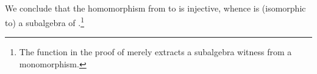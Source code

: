 \begin{itemize}
\begin{code}
\AgdaSpace{}%
\AgdaSpace{}%
\AgdaOperator{\AgdaFunction{𝔻[}}\AgdaSpace{}%
\AgdaSpace{}%
\AgdaSpace{}%
\AgdaOperator{\AgdaFunction{]}}\AgdaSpace{}%
\AgdaSpace{}%
\AgdaSymbol{(}\AgdaSpace{}%
\AgdaSpace{}%
\AgdaSymbol{;}\AgdaSpace{}%
\AgdaSpace{}%
\AgdaSymbol{;}\AgdaSpace{}%
\AgdaSpace{}%
\AgdaSymbol{)}\<%
\\
%
\>[3]\AgdaSpace{}%
\AgdaSymbol{:}\AgdaSpace{}%
\AgdaSpace{}%
\AgdaSpace{}%
\AgdaSpace{}%
\AgdaSpace{}%
\AgdaSpace{}%
\AgdaSpace{}%
\AgdaSpace{}%
\AgdaSpace{}%
\AgdaSpace{}%
\AgdaSpace{}%
\AgdaSpace{}%
\AgdaSpace{}%
\AgdaSpace{}%
\AgdaSpace{}%
\AgdaSpace{}%
\AgdaSpace{}%
\<%
\\
%
\>[3]%
\>[9]\AgdaSymbol{=}\AgdaSpace{}%
\AgdaSpace{}%
\AgdaSymbol{(}\AgdaSymbol{\{}\AgdaSpace{}%
\AgdaSymbol{=}\AgdaSpace{}%
\AgdaSpace{}%
\AgdaSpace{}%
\AgdaSymbol{\}(}\AgdaSpace{}%
\AgdaSpace{}%
\AgdaSpace{}%
\AgdaSymbol{)}\AgdaSpace{}%
\AgdaSymbol{)}\<%
\\
%
\>[9]\AgdaSymbol{(}\AgdaSpace{}%
\AgdaSpace{}%
\AgdaSymbol{(}\AgdaSpace{}%
\AgdaSymbol{)(}\AgdaSpace{}%
\AgdaSymbol{(}\AgdaSymbol{\{}\AgdaSpace{}%
\AgdaSymbol{=}\AgdaSpace{}%
\AgdaSpace{}%
\AgdaSpace{}%
\AgdaSymbol{\}}\AgdaSpace{}%
\AgdaSymbol{(}\AgdaSpace{}%
\AgdaSpace{}%
\AgdaSpace{}%
\AgdaSymbol{)}\AgdaSpace{}%
\AgdaSymbol{)))}\<%
\\
\>[0]\<%
\end{code}
\fi
\noindent We conclude that the homomorphism from  to  is injective, whence
 is (isomorphic to) a subalgebra of .\footnote{The function  in
the proof of  merely extracts a subalgebra witness from a monomorphism.}


\end{itemize}
